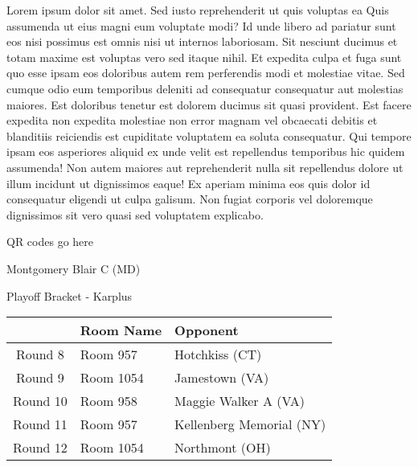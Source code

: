 \documentclass{article}%
\begin{document}
\vspace*{8pt}%
\linebreak%
\newline%
\newline%
Lorem ipsum dolor sit amet. Sed iusto reprehenderit ut quis voluptas ea Quis assumenda ut eius magni eum voluptate modi? Id unde libero ad pariatur sunt eos nisi possimus est omnis nisi ut internos laboriosam. Sit nesciunt ducimus et totam maxime est voluptas vero sed itaque nihil. Et expedita culpa et fuga sunt quo esse ipsam eos doloribus autem rem perferendis modi et molestiae vitae.\newline%
\newline%
Sed cumque odio eum temporibus deleniti ad consequatur consequatur aut molestias maiores. Est doloribus tenetur est dolorem ducimus sit quasi provident. Est facere expedita non expedita molestiae non error magnam vel obcaecati debitis et blanditiis reiciendis est cupiditate voluptatem ea soluta consequatur. Qui tempore ipsam eos asperiores aliquid ex unde velit est repellendus temporibus hic quidem assumenda!\newline%
\newline%
Non autem maiores aut reprehenderit nulla sit repellendus dolore ut illum incidunt ut dignissimos eaque! Ex aperiam minima eos quis dolor id consequatur eligendi ut culpa galisum. Non fugiat corporis vel doloremque dignissimos sit vero quasi sed voluptatem explicabo.\newline%
\newline%
%
\vspace*{30pt}%
\begin{center}%
\begin{Huge}%
QR codes go here%
\end{Huge}%
\end{center}%
\newpage%
\begin{center}%
\begin{Huge}%
Montgomery Blair C (MD)%
\end{Huge}%
\vspace*{8pt}%
\linebreak%
\begin{Large}%
Playoff Bracket {-} Karplus%
\end{Large}%
\end{center}%
%
\begin{tabularx}{\textwidth}{|c|Y|Y|}%
\hline%
&Room Name&Opponent\\%
\hline%
Round 8&Room 957&Hotchkiss (CT)\\%
Round 9&Room 1054&Jamestown (VA)\\%
Round 10&Room 958&Maggie Walker A (VA)\\%
Round 11&Room 957&Kellenberg Memorial (NY)\\%
Round 12&Room 1054&Northmont (OH)\\%
\hline%
\end{tabularx}%
\end{document}
